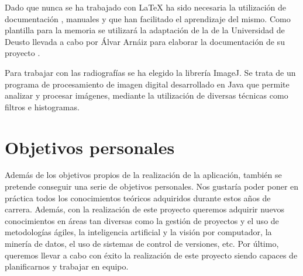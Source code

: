 Dado que nunca se ha trabajado con \LaTeX{} ha sido necesaria la utilización de documentación \cite{cervantex}, manuales \cite{introduccion_latex} y \cite{latex_wikibook} que han facilitado el aprendizaje del mismo. Como plantilla para la memoria se utilizará la adaptación de la de la Universidad de Deusto llevada a cabo por Álvar Arnáiz para elaborar la documentación de su proyecto \cite{proyectoAlvar}.

Para trabajar con las radiografías se ha elegido la librería ImageJ. Se trata de un programa de procesamiento de imagen digital desarrollado en Java que permite analizar y procesar imágenes, mediante la utilización de diversas técnicas como filtros e histogramas.

\section{Objetivos personales}
Además de los objetivos propios de la realización de la aplicación, también se pretende conseguir una serie de objetivos personales.
Nos gustaría poder poner en práctica todos los conocimientos teóricos adquiridos durante estos años de carrera. Además, con la realización de este proyecto queremos adquirir nuevos conocimientos en áreas tan diversas como la gestión de proyectos y el uso de metodologías ágiles, la inteligencia artificial y la visión por computador, la minería de datos, el uso de sistemas de control de versiones, etc.
Por último, queremos llevar a cabo con éxito la realización de este proyecto siendo capaces de planificarnos y trabajar en equipo.

